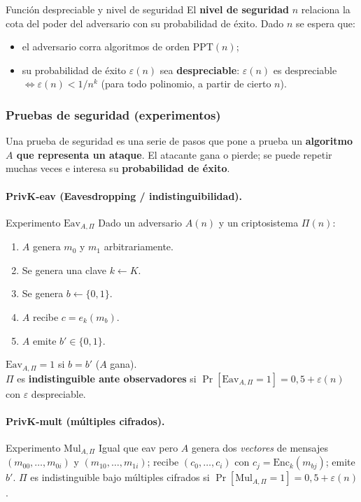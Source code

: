 \documentclass[../main.tex]{subfiles}
\begin{document}
\begin{definicion}{Función despreciable y nivel de seguridad}
El \textbf{nivel de seguridad} $n$ relaciona la cota del poder del adversario
con su probabilidad de éxito. Dado $n$ se espera que:
\begin{itemize}[nosep]
  \item el adversario corra algoritmos de orden $\text{PPT}(n)$;
  \item su probabilidad de éxito $\varepsilon(n)$ sea \textbf{despreciable}:
        $\varepsilon(n)$ es despreciable $\iff \varepsilon(n) < 1/n^k$
        (para todo polinomio, a partir de cierto $n$).
\end{itemize}
\end{definicion}

\subsubsection{Pruebas de seguridad (experimentos)}

Una prueba de seguridad es una serie de pasos que pone a prueba un
\textbf{algoritmo $A$ que representa un ataque}. El atacante gana o pierde; se
puede repetir muchas veces e interesa su \textbf{probabilidad de éxito}.

\paragraph{PrivK-eav (Eavesdropping / indistinguibilidad).}
\begin{definicion}{Experimento $\text{Eav}_{A,\Pi}$}
Dado un adversario $A(n)$ y un criptosistema $\Pi(n)$:
\begin{enumerate}[nosep]
  \item $A$ genera $m_0$ y $m_1$ arbitrariamente.
  \item Se genera una clave $k \leftarrow K$.
  \item Se genera $b \leftarrow \{0,1\}$.
  \item $A$ recibe $c = e_k(m_b)$.
  \item $A$ emite $b' \in \{0,1\}$.
\end{enumerate}
$\text{Eav}_{A,\Pi}=1$ si $b=b'$ ($A$ gana).\\
$\Pi$ es \textbf{indistinguible ante observadores} si
$\Pr[\text{Eav}_{A,\Pi}{=}1] = 0{,}5 + \varepsilon(n)$ con $\varepsilon$
despreciable.
\end{definicion}

\paragraph{PrivK-mult (múltiples cifrados).}
\begin{definicion}{Experimento $\text{Mul}_{A,\Pi}$}
Igual que eav pero $A$ genera dos \emph{vectores} de mensajes
$(m_{00},\dots,m_{0i})$ y $(m_{10},\dots,m_{1i})$; recibe $(c_0,\dots,c_i)$ con
$c_j=\text{Enc}_k(m_{bj})$; emite $b'$. $\Pi$ es indistinguible bajo múltiples
cifrados si $\Pr[\text{Mul}_{A,\Pi}{=}1]=0{,}5+\varepsilon(n)$.
\end{definicion}
\end{document}
